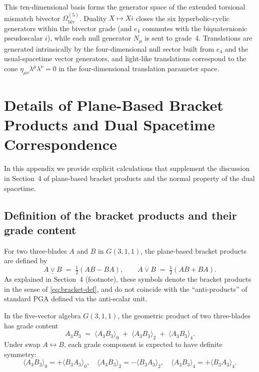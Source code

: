\documentclass[dvipdfmx,a4paper]{article}
\theoremstyle{definition}
\theoremstyle{plain}
\theoremstyle{remark}
\begin{document}
This ten-dimensional basis forms the generator space of the extended torsional mismatch bivector \(\Omega_{\text{biv}}^{(5)}\). Duality \(X\mapsto Xi\) closes the six hyperbolic-cyclic generators within the bivector grade (and \(e_{4}\) commutes with the biquaternionic pseudoscalar \(i\)), while each null generator \(N_{\mu}\) is sent to grade~4. Translations are generated intrinsically by the four-dimensional null sector built from \(e_{4}\) and the usual-spacetime vector generators, and light-like translations correspond to the cone \(\eta_{\mu\nu}\lambda^{\mu}\lambda^{\nu}=0\) in the four-dimensional translation parameter space.

\section{Details of Plane-Based Bracket Products and Dual Spacetime Correspondence}

In this appendix we provide explicit calculations that supplement the discussion in Section~4 of plane-based bracket products and the normal property of the dual spacetime.

\subsection{Definition of the bracket products and their grade content}

For two three-blades \(A\) and \(B\) in \(G(3,1,1)\), the plane-based bracket products are defined by
\[
A \mathbin{\underline{\vee}} B \;=\; \tfrac12 (AB - BA), \qquad
A \mathbin{\overline{\vee}} B \;=\; \tfrac12 (AB + BA).
\]
As explained in Section~4 (footnote), these symbols denote the bracket products in the sense of \eqref{eq:bracket-def}, and do not coincide with the ``anti-products'' of standard PGA defined via the anti-scalar unit.

In the five-vector algebra \(G(3,1,1)\), the geometric product of two three-blades has grade content
\[
A_{3}B_{3} \;=\; \langle A_{3}B_{3}\rangle_{0} \;+\; \langle A_{3}B_{3}\rangle_{2} \;+\; \langle A_{3}B_{3}\rangle_{4}.
\]
Under swap \(A\leftrightarrow B\), each grade component is expected to have definite symmetry:
\begin{equation}
\langle A_{3}B_{3}\rangle_{0} = +\langle B_{3}A_{3}\rangle_{0},
\quad
\langle A_{3}B_{3}\rangle_{2} = -\langle B_{3}A_{3}\rangle_{2},
\quad
\langle A_{3}B_{3}\rangle_{4} = +\langle B_{3}A_{3}\rangle_{4}.
\label{eq:grade-symmetry}
\end{equation}
\end{document}
